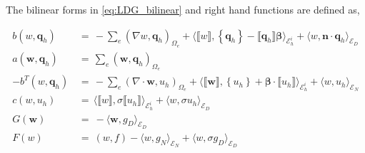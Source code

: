 \documentclass[10pt]{report}
\numberwithin{equation}{section}
\begin{document}
\vspace{2mm}

The bilinear forms  in \eqref{eq:LDG_bilinear} and right hand functions are defined as,

\begin{align}
b(w, \textbf{q}_{h}) \, &= \,
-
\sum_{e}  \left(\nabla w, \textbf{q}_{h} \right)_{\Omega_{e}}
+
\langle \llbracket w \rrbracket, 
\left\{\textbf{q}_{h} \right\} - \llbracket \textbf{q}_{h} \rrbracket \boldsymbol \beta \rangle_{\mathcal{E}_{h}^{i}} 
 + 
\langle w, \textbf{n} \cdot \textbf{q}_{h} \rangle_{\mathcal{E}_{D}}
\\
a(\textbf{w},\textbf{q}_{h}) \, &= \,  
\sum_{e} \left(\textbf{w}, \textbf{q}_{h} \right)_{\Omega_{e}} \\
-b^{T}(w, \textbf{q}_{h}) \, &= \,
-
\sum_{e}  \left(\nabla \cdot \textbf{w}, u_{h} \right)_{\Omega_{e}} 
+ 
\langle  \llbracket \textbf{w} \rrbracket, \left\{u_{h} \right\} + \boldsymbol \beta \cdot \llbracket u_{h} \rrbracket \rangle_{\mathcal{E}_h^{i} }
+
\langle w, u_{h} \rangle_{\mathcal{E}_{N} } \\
c(w,u_{h}) \, &= \,
\langle \llbracket w \rrbracket,  \sigma \llbracket u_{h} \rrbracket \rangle_{\mathcal{E}_{h}^{i}}
+
\langle  w, \sigma u_{h} \rangle_{\mathcal{E}_{D}}  \\
G(\textbf{w}) \ & = \ - \langle \textbf{w}, g_{D} \rangle_{\mathcal{E}_{D}}\\
F(w) \ & = \  (w,f) - \langle w, g_{N} \rangle_{\mathcal{E}_{N}}  + \langle w, \sigma g_{D} \rangle_{\mathcal{E}_{D}} 
\end{align}
\end{document}
